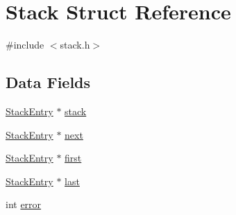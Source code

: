\hypertarget{structStack}{\section{Stack Struct Reference}
\label{structStack}
}


{\ttfamily \#include $<$stack.\+h$>$}

\subsection*{Data Fields}
\begin{DoxyCompactItemize}
\item 
\hyperlink{stack_8h_a80224846ff1c5497af1685d021a936cb}{Stack\+Entry} $\ast$ \hyperlink{structStack_a3185fa37465828253fe2887b088f9410}{stack}
\item 
\hyperlink{stack_8h_a80224846ff1c5497af1685d021a936cb}{Stack\+Entry} $\ast$ \hyperlink{structStack_a4c04e7b5364862dbdfb45fe220ab4c96}{next}
\item 
\hyperlink{stack_8h_a80224846ff1c5497af1685d021a936cb}{Stack\+Entry} $\ast$ \hyperlink{structStack_a9932a36ba07f484c43308e299658e0e3}{first}
\item 
\hyperlink{stack_8h_a80224846ff1c5497af1685d021a936cb}{Stack\+Entry} $\ast$ \hyperlink{structStack_aa7b585e586d8923871ef36fe3f95810e}{last}
\item 
int \hyperlink{structStack_a03bccc642450885750e515d97a17bfaf}{error}
\end{DoxyCompactItemize}


